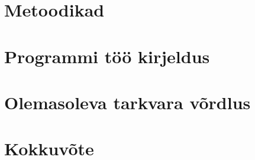 \documentclass[12pt, a4paper]{report}
\begin{document}
\chapter{Metoodikad}\label{chapter:metoodika}


\chapter{Programmi töö kirjeldus}\label{chapter:kirjeldus}


\chapter{Olemasoleva tarkvara võrdlus}\label{chapter:soft}


\chapter{Kokkuvõte}\label{chapter:summary} 


\pagebreak
{}
{}
\printbibliography



\end{document}
